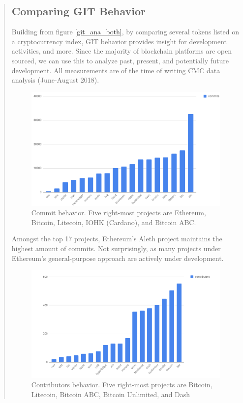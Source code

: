 \documentclass[12pt, titlepage, twocolumn]{report}
\begin{document}
\begin{quotation}
\subsection{Comparing GIT Behavior}

Building from figure \ref{git_ana_both}, by comparing several tokens listed on a cryptocurrency index, GIT behavior provides insight for development activities, and more. Since the majority of blockchain platforms are open sourced, we can use this to analyze past, present, and potentially future development. All measurements are of the time of writing CMC data analysis (June-August 2018).

\begin{figure}[ht]
\centering
	\includegraphics[width=\textwidth]{commits}
	\caption{Commit behavior. Five right-most projects are Ethereum, Bitcoin, Litecoin, IOHK (Cardano), and Bitcoin ABC.}
	\label{commits}
\end{figure}

Amongst the top 17 projects, Ethereum's Aleth project maintains the highest amount of commits. Not surprisingly, as many projects under Ethereum's general-purpose approach are actively under development.


\begin{figure}[ht]
\centering
	\includegraphics[width=\textwidth]{contributors}
	\caption{Contributors behavior. Five right-most projects are Bitcoin, Litecoin, Bitcoin ABC, Bitcoin Unlimited, and Dash}
	\label{contributors}
\end{figure}


\end{quotation}
\end{document}
